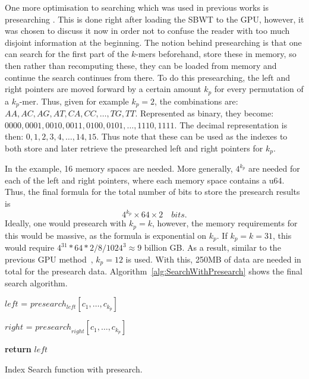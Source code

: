 One more optimisation to searching which was used in previous works is presearching \cite{Presearch, SBWT, Harri}.
This is done right after loading the SBWT to the GPU, however, it was chosen to discuss it now in order not to confuse the reader with too much disjoint information at the beginning.
The notion behind presearching is that one can search for the first part of the $k$-mers beforehand, store these in memory, so then rather than recomputing these, they can be loaded from memory and continue the search continues from there.
To do this presearching, the left and right pointers are moved forward by a certain amount $k_p$ for every permutation of a $k_p$-mer.
Thus, given for example $k_p=2$, the combinations are: $AA, AC, AG, AT, CA, CC, \ldots, TG, TT$.
Represented as binary, they become: $0000, 0001, 0010, 0011, 0100, 0101, \ldots, 1110, 1111$.
The decimal representation is then: $0, 1, 2, 3, 4, \ldots, 14, 15$.
Thus note that these can be used as the indexes to both store and later retrieve the presearched left and right pointers for $k_p$.

In the example, 16 memory spaces are needed.
More generally, $4^{k_p}$ are needed for each of the left and right pointers, where each memory space contains a u64.
Thus, the final formula for the total number of bits to store the presearch results is \[4^{k_p} \times 64 \times 2 \quad \mathit{bits}.\]
Ideally, one would presearch with $k_p = k$, however, the memory requirements for this would be massive, as the formula is exponential on $k_p$.
If $k_p=k=31$, this would require $4^{31} * 64 * 2 / 8 / 1024 ^ 3 \approx 9$ billion GB.
As a result, similar to the previous GPU method~\cite{Harri}, $k_p=12$ is used.
With this, 250MB of data are needed in total for the presearch data.
Algorithm~\ref{alg:SearchWithPresearch} shows the final search algorithm.

\begin{algorithm}
  $\mathit{left}$ = $presearch_{\mathit{left}}[c_1, \ldots, c_{k_p}]$

  $\mathit{right}$ = $\mathit{presearch}_{right}[c_1, \ldots, c_{k_p}]$


  \textbf{return} $left$

  \caption{Index Search function with presearch.}\label{alg:SearchWithPresearch}
\end{algorithm}

